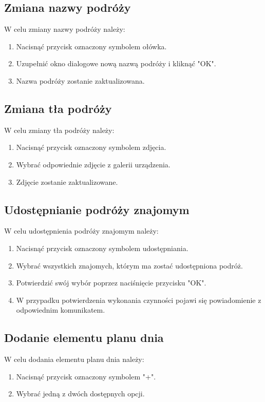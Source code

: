 \subsection{Zmiana nazwy podróży}

W celu zmiany nazwy podróży należy:
\begin{enumerate}
\item Nacisnąć przycisk oznaczony symbolem ołówka.
\item Uzupełnić okno dialogowe nową nazwą podróży i kliknąć "OK".
\item Nazwa podróży zostanie zaktualizowana.
\end{enumerate}

\subsection{Zmiana tła podróży}

W celu zmiany tła podróży należy:
\begin{enumerate}
\item Nacisnąć przycisk oznaczony symbolem zdjęcia.
\item Wybrać odpowiednie zdjęcie z galerii urządzenia.
\item Zdjęcie zostanie zaktualizowane.
\end{enumerate}

\subsection{Udostępnianie podróży znajomym}

W celu udostępnienia podróży znajomym należy:
\begin{enumerate}
\item Nacisnąć przycisk oznaczony symbolem udostępniania.
\item Wybrać wszystkich znajomych, którym ma zostać udostępniona podróż.
\item Potwierdzić swój wybór poprzez naciśnięcie przycisku "OK".
\item W przypadku potwierdzenia wykonania czynności pojawi się powiadomienie z odpowiednim komunikatem.
\end{enumerate}

\subsection{Dodanie elementu planu dnia}
W celu dodania elementu planu dnia należy:
\begin{enumerate}
\item Nacisnąć przycisk oznaczony symbolem "+".
\item Wybrać jedną z dwóch dostępnych opcji.
\end{enumerate}


